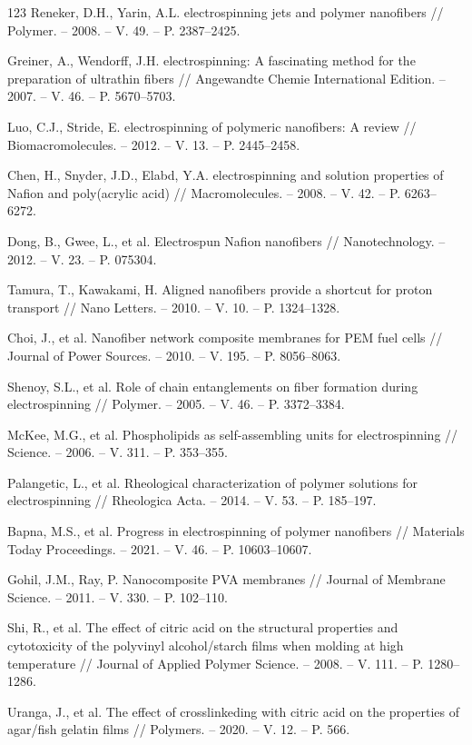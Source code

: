 \documentclass[12pt,a4paper]{report}
\begin{document}
\begin{thebibliography}{123}
 Reneker, D.H., Yarin, A.L. electrospinning jets and polymer nanofibers // Polymer. – 2008. – V. 49. – P. 2387–2425.

 Greiner, A., Wendorff, J.H. electrospinning: A fascinating method for the preparation of ultrathin fibers // Angewandte Chemie International Edition. – 2007. – V. 46. – P. 5670–5703.

 Luo, C.J., Stride, E. electrospinning of polymeric nanofibers: A review // Biomacromolecules. – 2012. – V. 13. – P. 2445–2458.

 Chen, H., Snyder, J.D., Elabd, Y.A. electrospinning and solution properties of Nafion and poly(acrylic acid) // Macromolecules. – 2008. – V. 42. – P. 6263–6272.

 Dong, B., Gwee, L., et al. Electrospun Nafion nanofibers // Nanotechnology. – 2012. – V. 23. – P. 075304.

 Tamura, T., Kawakami, H. Aligned nanofibers provide a shortcut for proton transport // Nano Letters. – 2010. – V. 10. – P. 1324–1328.

 Choi, J., et al. Nanofiber network composite membranes for PEM fuel cells // Journal of Power Sources. – 2010. – V. 195. – P. 8056–8063.

 Shenoy, S.L., et al. Role of chain entanglements on fiber formation during electrospinning // Polymer. – 2005. – V. 46. – P. 3372–3384.

 McKee, M.G., et al. Phospholipids as self-assembling units for electrospinning // Science. – 2006. – V. 311. – P. 353–355.

 Palangetic, L., et al. Rheological characterization of polymer solutions for electrospinning // Rheologica Acta. – 2014. – V. 53. – P. 185–197.

 Bapna, M.S., et al. Progress in electrospinning of polymer nanofibers // Materials Today Proceedings. – 2021. – V. 46. – P. 10603–10607.

 Gohil, J.M., Ray, P. Nanocomposite PVA membranes // Journal of Membrane Science. – 2011. – V. 330. – P. 102–110.

 Shi, R., et al. The effect of citric acid on the structural properties and cytotoxicity of the polyvinyl alcohol/starch films when molding at high temperature // Journal of Applied Polymer Science. – 2008. – V. 111. – P. 1280–1286.

 Uranga, J., et al. The effect of crosslinkeding with citric acid on the properties of agar/fish gelatin films // Polymers. – 2020. – V. 12. – P. 566.


\end{thebibliography}
\end{document}
